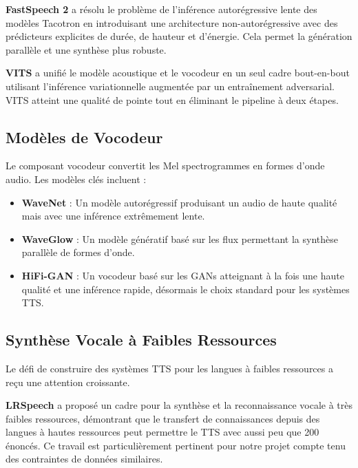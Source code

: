 \documentclass[12pt,a4paper]{article}
\begin{document}
\textbf{FastSpeech 2} \citep{ren2020fastspeech} a résolu le problème de l'inférence autorégressive lente des modèles Tacotron en introduisant une architecture non-autorégressive avec des prédicteurs explicites de durée, de hauteur et d'énergie. Cela permet la génération parallèle et une synthèse plus robuste.

\textbf{VITS} \citep{kim2021conditional} a unifié le modèle acoustique et le vocodeur en un seul cadre bout-en-bout utilisant l'inférence variationnelle augmentée par un entraînement adversarial. VITS atteint une qualité de pointe tout en éliminant le pipeline à deux étapes.

\subsection{Modèles de Vocodeur}

Le composant vocodeur convertit les Mel spectrogrammes en formes d'onde audio. Les modèles clés incluent :

\begin{itemize}
    \item \textbf{WaveNet} \citep{van2016wavenet} : Un modèle autorégressif produisant un audio de haute qualité mais avec une inférence extrêmement lente.
    \item \textbf{WaveGlow} : Un modèle génératif basé sur les flux permettant la synthèse parallèle de formes d'onde.
    \item \textbf{HiFi-GAN} \citep{kong2020hifi} : Un vocodeur basé sur les GANs atteignant à la fois une haute qualité et une inférence rapide, désormais le choix standard pour les systèmes TTS.
\end{itemize}

\subsection{Synthèse Vocale à Faibles Ressources}

Le défi de construire des systèmes TTS pour les langues à faibles ressources a reçu une attention croissante.

\textbf{LRSpeech} \citep{xu2020lrspeech} a proposé un cadre pour la synthèse et la reconnaissance vocale à très faibles ressources, démontrant que le transfert de connaissances depuis des langues à hautes ressources peut permettre le TTS avec aussi peu que 200 énoncés. Ce travail est particulièrement pertinent pour notre projet compte tenu des contraintes de données similaires.
\end{document}
